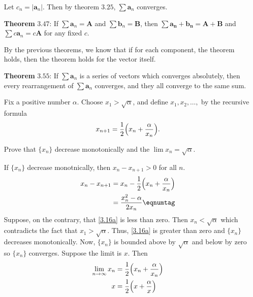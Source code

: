\begin{exercise}
  Let \(c_n = \lvert\mathbold{a}_n\rvert\).
  Then by theorem \(3.25\), \(\sum\mathbold{a}_n\) converges.
  \par\smallskip
  \textbf{Theorem} \(\mathbold{3.47}\): If
  \(\sum\mathbold{a}_n = \mathbold{A}\) and
  \(\sum\mathbold{b}_n = \mathbold{B}\), then
  \(\sum\mathbold{a_n + b_n} = \mathbold{A + B}\) and
  \(\sum c\mathbold{a}_n = c\mathbold{A}\) for any fixed \(c\).
  \par\smallskip
  By the previous theorems, we know that if for each component, the theorem
  holds, then the theorem holds for the vector itself.
  \par\smallskip
  \textbf{Theorem} \(\mathbold{3.55}\): If \(\sum\mathbold{a}_n\) is a series
  of vectors which converges absolutely, then every rearrangement of
  \(\sum\mathbold{a}_n\) converges, and they all converge to the same sum.
  \par\smallskip
\item
  \label{3.16}
  Fix a positive number \(\alpha\).
  Choose \(x_1 > \sqrt{\alpha}\), and define \(x_1,x_2,\ldots,\) by the
  recursive formula
  \[
  x_{n + 1} = \frac{1}{2}\Bigl(x_n + \frac{\alpha}{x_n}\Bigr).
  \]
  \begin{exercise}[label = (\alph*)]
  \item
    Prove that \(\{x_n\}\) decrease monotonically and the
    \(\lim x_n = \sqrt{\alpha}\).
    \par\smallskip
    If \(\{x_n\}\) decrease monotnically, then \(x_n - x_{n + 1} > 0\) for all
    \(n\).
    \begin{align*}
      x_n - x_{n + 1} & = x_n -
                        \frac{1}{2}\Bigl(x_n + \frac{\alpha}{x_n}\Bigr)\\
                      & = \frac{x_n^2 - \alpha}{2x_n}\eqnumtag\label{3.16a}
    \end{align*}
    Suppose, on the contrary, that \cref{3.16a} is less than zero.
    Then \(x_n < \sqrt{\alpha}\) which contradicts the fact that
    \(x_1 > \sqrt{\alpha}\).
    Thus, \cref{3.16a} is greater than zero and \(\{x_n\}\) decreases
    monotonically.
    Now, \(\{x_n\}\) is bounded above by \(\sqrt{\alpha}\) and below by zero so
    \(\{x_n\}\) converges.
    Suppose the limit is \(x\).
    Then
    \begin{align*}
      \lim_{n\to\infty}x_n & =
                             \frac{1}{2}\Bigl(x_n + \frac{\alpha}{x_n}\Bigr)\\
      x & = \frac{1}{2}\Bigl(x + \frac{\alpha}{x}\Bigr)\\

\end{align*}
\end{exercise}
\end{exercise}
